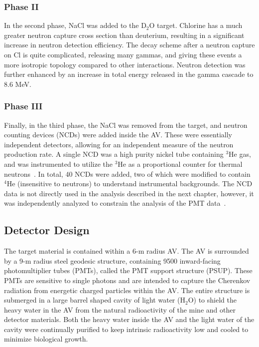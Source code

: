 \subsubsection{Phase II}

In the second phase, NaCl was added to the D$_2$O target.
Chlorine has a much greater neutron capture cross section than deuterium, resulting in a significant increase in neutron detection efficiency.
The decay scheme after a neutron capture on Cl is quite complicated, releasing many gammas, and giving these events a more isotropic topology compared to other interactions.
Neutron detection was further enhanced by an increase in total energy released in the gamma cascade to 8.6 MeV.

\subsubsection{Phase III}

Finally, in the third phase, the NaCl was removed from the target, and neutron counting devices (NCDs) were added inside the AV.
These were essentially independent detectors, allowing for an independent measure of the neutron production rate.
A single NCD was a high purity nickel tube containing $^3$He gas, and was instrumented to utilize the $^3$He as a proportional counter for thermal neutrons~\cite{sno_ncd_psa}.
In total, 40 NCDs were added, two of which were modified to contain $^4$He (insensitive to neutrons) to understand instrumental backgrounds.
The NCD data is not directly used in the analysis described in the next chapter, however, it was independently analyzed to constrain the analysis of the PMT data~\cite{3phase}.

\subsection{Detector Design}

The target material is contained within a 6-m radius AV.
The AV is surrounded by a 9-m radius steel geodesic structure, containing 9500 inward-facing photomultiplier tubes (PMTs), called the PMT support structure (PSUP).
These PMTs are sensitive to single photons and are intended to capture the Cherenkov radiation from energetic charged particles within the AV.
The entire structure is submerged in a large barrel shaped cavity of light water (H$_2$O) to shield the heavy water in the AV from the natural radioactivity of the mine and other detector materials.
Both the heavy water inside the AV and the light water of the cavity were continually purified to keep intrinsic radioactivity low and cooled to minimize biological growth.

